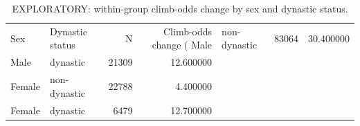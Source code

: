 \begin{table}[htbp]
\centering
\begin{tabular}{llrr}
\toprule
Sex & Dynastic status & N & Climb-odds change (%
\midrule
Male & non-dynastic & 83064 & 30.400000 \\
Male & dynastic & 21309 & 12.600000 \\
Female & non-dynastic & 22788 & 4.400000 \\
Female & dynastic & 6479 & 12.700000 \\
\bottomrule
\end{tabular}

\caption{EXPLORATORY: within-group climb-odds change by sex and dynastic status.}
\label{tab:dynasty_moderation_summary}
\end{table}
